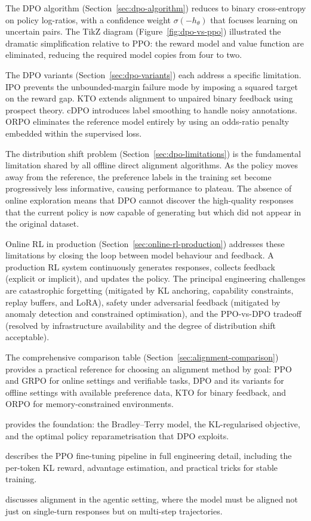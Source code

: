 The DPO algorithm (Section~\ref{sec:dpo-algorithm}) reduces to binary cross-entropy on policy log-ratios, with a confidence weight $\sigma(-h_\theta)$ that focuses learning on uncertain pairs. The TikZ diagram (Figure~\ref{fig:dpo-vs-ppo}) illustrated the dramatic simplification relative to PPO: the reward model and value function are eliminated, reducing the required model copies from four to two.

The DPO variants (Section~\ref{sec:dpo-variants}) each address a specific limitation. IPO prevents the unbounded-margin failure mode by imposing a squared target on the reward gap. KTO extends alignment to unpaired binary feedback using prospect theory. cDPO introduces label smoothing to handle noisy annotations. ORPO eliminates the reference model entirely by using an odds-ratio penalty embedded within the supervised loss.

The distribution shift problem (Section~\ref{sec:dpo-limitations}) is the fundamental limitation shared by all offline direct alignment algorithms. As the policy moves away from the reference, the preference labels in the training set become progressively less informative, causing performance to plateau. The absence of online exploration means that DPO cannot discover the high-quality responses that the current policy is now capable of generating but which did not appear in the original dataset.

Online RL in production (Section~\ref{sec:online-rl-production}) addresses these limitations by closing the loop between model behaviour and feedback. A production RL system continuously generates responses, collects feedback (explicit or implicit), and updates the policy. The principal engineering challenges are catastrophic forgetting (mitigated by KL anchoring, capability constraints, replay buffers, and LoRA), safety under adversarial feedback (mitigated by anomaly detection and constrained optimisation), and the PPO-vs-DPO tradeoff (resolved by infrastructure availability and the degree of distribution shift acceptable).

The comprehensive comparison table (Section~\ref{sec:alignment-comparison}) provides a practical reference for choosing an alignment method by goal: PPO and GRPO for online settings and verifiable tasks, DPO and its variants for offline settings with available preference data, KTO for binary feedback, and ORPO for memory-constrained environments.

\begin{description}[leftmargin=!,labelwidth=3.5cm]
  \item[Chapter~\ref{ch:reward-models}] provides the foundation: the Bradley--Terry model, the KL-regularised objective, and the optimal policy reparametrisation that DPO exploits.
  \item[Chapter~\ref{ch:practical-rlhf}] describes the PPO fine-tuning pipeline in full engineering detail, including the per-token KL reward, advantage estimation, and practical tricks for stable training.
  \item[Chapter~\ref{ch:agents}] discusses alignment in the agentic setting, where the model must be aligned not just on single-turn responses but on multi-step trajectories.
\end{description}

